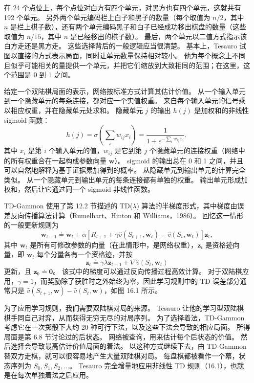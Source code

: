 \documentclass[UTF8, 12pt, fontset=fandol, oneside]{ctexart}
\begin{document}
在 24 个点位上，每个点位对白方有四个单元，对黑方也有四个单元，这就共有 192 个单元。
另外两个单元编码栏上白子和黑子的数量（每个取值为 $n/2$，其中 $n$ 是栏上棋子数），还有两个单元编码黑子和白子已经成功移出棋盘的数量（这些取值为 $n/15$，其中 $n$ 是已经移出的棋子数）。
最后，两个单元以二值方式指示该白方走还是黑方走。
这些选择背后的一般逻辑应当很清楚。
基本上，Tesauro 试图以直接的方式表示局面，同时让单元数量保持相对较小。
他为每个概念上不同且似乎可能相关的量提供一个单元，并把它们缩放到大致相同的范围；在这里，这个范围是 0 到 1 之间。

给定一个双陆棋局面的表示，网络按标准方式计算其估计价值。
从一个输入单元到一个隐藏单元的每条连接，都对应一个实值权重。
来自每个输入单元的信号乘以相应权重，并在隐藏单元处求和。
隐藏单元 $j$ 的输出 $h(j)$ 是加权和的非线性 sigmoid 函数：
\[
h(j)=\sigma\left(\sum_i w_{ij}x_i\right)
=\frac{1}{1+e^{-\sum_i w_{ij}x_i}},
\]
其中 $x_i$ 是第 $i$ 个输入单元的值，$w_{ij}$ 是它到第 $j$ 个隐藏单元的连接权重（网络中的所有权重合在一起构成参数向量 $\mathbf{w}$）。
sigmoid 的输出总在 0 和 1 之间，并且可以自然地解释为基于证据累加得到的概率。
从隐藏单元到输出单元的计算完全类似。
从一个隐藏单元到输出单元的每条连接都有单独的权重。
输出单元形成加权和，然后让它通过同一个 sigmoid 非线性函数。

TD-Gammon 使用了第 12.2 节描述的 TD($\lambda$) 算法的半梯度形式，其中梯度由误差反向传播算法计算（Rumelhart、Hinton 和 Williams，1986）。
回忆这一情形的一般更新规则为
\begin{equation}
\mathbf{w}_{t+1}\doteq \mathbf{w}_t+\alpha\left[R_{t+1}+\gamma\hat v(S_{t+1},\mathbf{w}_t)-\hat v(S_t,\mathbf{w}_t)\right]\mathbf{z}_t,
\tag{16.1}
\end{equation}
其中 $\mathbf{w}_t$ 是所有可修改参数的向量（在此情形中，是网络权重），$\mathbf{z}_t$ 是资格迹向量，即 $\mathbf{w}_t$ 每个分量各有一个资格迹，并按
\[
\mathbf{z}_t\doteq \gamma\lambda\mathbf{z}_{t-1}+\nabla\hat v(S_t,\mathbf{w}_t)
\]
更新，且 $\mathbf{z}_0\doteq \mathbf{0}$。
该式中的梯度可以通过反向传播过程高效计算。
对于双陆棋应用，$\gamma=1$，而奖励除了获胜时之外始终为零，因此学习规则中的 TD 误差部分通常只是 $\hat v(S_{t+1},\mathbf{w})-\hat v(S_t,\mathbf{w})$，如图 16.1 所示。

为了应用学习规则，我们需要双陆棋对局的来源。
Tesauro 让他的学习型双陆棋棋手同自己对弈，从而获得无穷无尽的对局序列。
为了选择着法，TD-Gammon 考虑它在一次掷骰下大约 20 种可行下法，以及这些下法会导致的相应局面。
所得局面是第 6.8 节讨论过的后状态。
网络被查询，用来估计每个后状态的价值。
然后选择会导致最高估计价值局面的着法。
以这种方式继续下去，由 TD-Gammon 替双方走棋，就可以很容易地产生大量双陆棋对局。
每盘棋都被看作一个幕，状态序列为 $S_0,S_1,S_2,\ldots$。
Tesauro 完全增量地应用非线性 TD 规则（16.1），也就是在每次单独着法之后应用。
\end{document}
